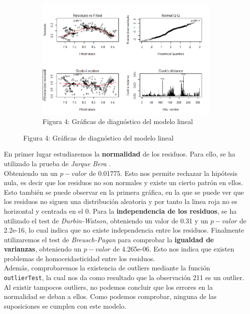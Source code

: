 \documentclass[a4paper, 7pt]{article}
\begin{document}
\begin{figure}[H]
  \centering
  \begin{subfigure}[b]{0.5\linewidth}
    \includegraphics[width=\linewidth]{report/images/question-2/Rplot.png}
    \caption{Figura 4: Gráficas de diagnóstico del modelo lineal}
  \end{subfigure}
  \label{fig:coffee}
\end{figure}

En primer lugar estudiaremos la \textbf{normalidad} de los residuos. Para ello, se ha utilizado la prueba de \textit{Jarque Bera} \cite{jarquebera}.\\

Obteniendo un un $p-valor$ de 0.01775. Esto nos permite rechazar la hipótesis nula, es decir que los residuos no son normales y existe un cierto patrón en ellos. Esto también se puede observar en la primera gráfica, en la que se puede ver que los residuos no siguen una distribución aleatoria y por tanto la linea roja no es horizontal y centrada en el 0. Para la \textbf{independencia de los residuos}, se ha utilizado el test de \textit{Durbin-Watson}, obteniendo un valor de 0.31 y un $p-valor$ de 2.2e-16, lo cual indica que no existe independencia entre los residuos. Finalmente utilizaremos el test de \textit{Breusch-Pagan} para comprobar la \textbf{igualdad de varianzas}, obteniendo un $p-valor$ de 4.265e-06. Esto nos indica que existen problemas de homoceidasticidad entre los residuos. \\

Además, comprobaremos la existencia de outliers mediante la función \texttt{outlierTest}, la cual nos da como resultado que la observación 211 es un outlier. Al existir tampocos outliers, no podemos concluir que los errores en la normalidad se deban a ellos. Como podemos comprobar, ninguna de las suposiciones se cumplen con este modelo.
\end{document}
